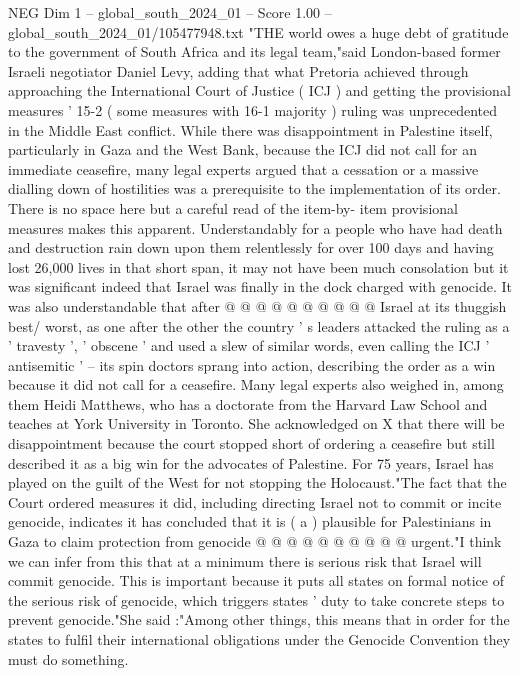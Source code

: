 \begin{textsample}{NEG Dim 1 – global\_south\_2024\_01 – Score 1.00 – global\_south\_2024\_01/105477948.txt}  \label{ex:f1_neg_356}
"THE world owes a huge debt of gratitude to the government of South Africa and its legal team,"said London-based former Israeli negotiator Daniel Levy, adding that what Pretoria achieved through approaching the International Court of Justice ( ICJ ) and getting the provisional measures ' 15-2 ( some measures with 16-1 majority ) ruling was unprecedented in the Middle East conflict.
While there was disappointment in Palestine itself, particularly in Gaza and the West Bank, because the ICJ did not call for an immediate ceasefire, many legal experts argued that a cessation or a massive dialling down of hostilities was a prerequisite to the implementation of its order.
There is no space here but a careful read of the item-by- item provisional measures makes this apparent.
Understandably for a people who have had death and destruction rain down upon them relentlessly for over 100 days and having lost 26,000 lives in that short span, it may not have been much consolation but it was significant indeed that Israel was finally in the dock charged with genocide.
It was also understandable that after @ @ @ @ @ @ @ @ @ @ Israel at its thuggish best/ worst, as one after the other the country ' s leaders attacked the ruling as a ' travesty ', ' obscene ' and used a slew of similar words, even calling the ICJ ' antisemitic ' -- its spin doctors sprang into action, describing the order as a win because it did not call for a ceasefire.
Many legal experts also weighed in, among them Heidi Matthews, who has a doctorate from the Harvard Law School and teaches at York University in Toronto.
She acknowledged on X that there will be disappointment because the court stopped short of ordering a ceasefire but still described it as a big win for the advocates of Palestine.
For 75 years, Israel has played on the guilt of the West for not stopping the Holocaust."The fact that the Court ordered measures it did, including directing Israel not to commit or incite genocide, indicates it has concluded that it is ( a ) plausible for Palestinians in Gaza to claim protection from genocide @ @ @ @ @ @ @ @ @ @ urgent."I think we can infer from this that at a minimum there is serious risk that Israel will commit genocide.
This is important because it puts all states on formal notice of the serious risk of genocide, which triggers states ' duty to take concrete steps to prevent genocide."She said :"Among other things, this means that in order for the states to fulfil their international obligations under the Genocide Convention they must do something.

\end{textsample}
